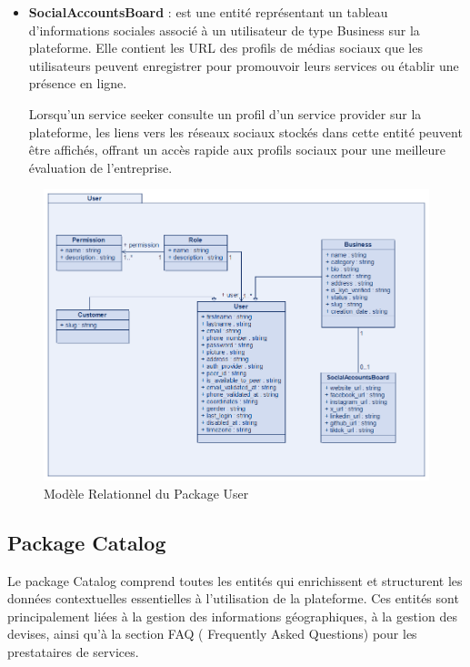 {\begin{itemize}
    \item \textbf{SocialAccountsBoard} : est une entité représentant un tableau d'informations sociales associé à un utilisateur de type Business sur la plateforme. Elle contient les URL des profils de médias sociaux que les utilisateurs peuvent enregistrer pour promouvoir leurs services ou établir une présence en ligne. 

    \vspace{0.35cm}

    Lorsqu'un service seeker consulte un profil d'un service provider sur la plateforme, les liens vers les réseaux sociaux stockés dans cette entité peuvent être affichés, offrant un accès rapide aux profils sociaux pour une meilleure évaluation de l'entreprise.
\end{itemize}

\vspace{0.35cm}

\begin{figure}[H]
\begin{center}
\includegraphics[width=15cm]{assets/diagrams/UserPackage.png}
\end{center}
\caption{Modèle Relationnel du Package User}
\end{figure}
\vspace{0.35cm}

\subsection{Package Catalog}
Le package Catalog comprend toutes les entités qui enrichissent et structurent les données contextuelles essentielles à l'utilisation de la plateforme. Ces entités sont principalement liées à la gestion des informations géographiques, à la gestion des devises, ainsi qu'à la section FAQ ( Frequently Asked Questions) pour les prestataires de services. 

}
